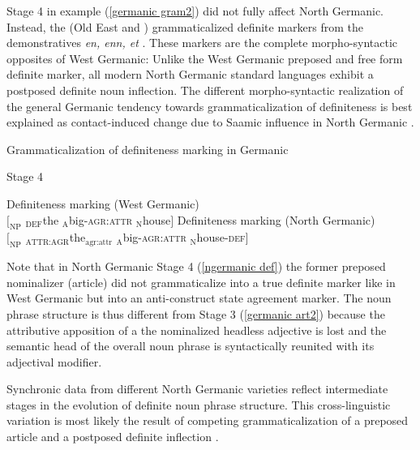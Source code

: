 {Stage 4 in example (\ref{germanic gram2})
did not fully affect North Germanic. Instead, the  (Old East and ) grammaticalized definite markers from the demonstratives \textit{en, enn, et} \citep[15]{heinrichs1954}. These markers are the complete morpho-syntactic opposites of West Germanic: Unlike the West Germanic preposed and free form definite marker, all modern North Germanic standard languages exhibit a postposed definite noun inflection. The different morpho-syntactic realization of the general Germanic tendency towards grammaticalization of definiteness is best explained as contact-induced change due to Saamic influence in North Germanic \citep{kusmenko2008}.
\begin{exe}
\label{germanic gram3}
\ex \rm{Grammaticalization of definiteness marking in Germanic}
\begin{xlist}
\ex \rm{Stage 4}
\begin{xlist}
\ex \rm{Definiteness marking (West Germanic)}\\
$[_{\text{NP}}$ $_{\text{DEF}}$the $_{\text{A}}$big-\textsc{agr:attr} $_{\text{N}}$house$]$
\ex \rm{Definiteness marking (North Germanic)}\\
$[_{\text{NP}}$ $_{\text{ATTR:AGR}}$the$_{\text{agr:attr}}$ $_{\text{A}}$big-\textsc{agr:attr} $_{\text{N}}$house-\textsc{def}$]$\label{ngermanic def}
\end{xlist}
\end{xlist}
\end{exe}
Note that in North Germanic Stage 4 (\ref{ngermanic def}) the former preposed nominalizer (article) did not grammaticalize into a true definite marker like in West Germanic but into an anti\hyp{}construct state agreement marker. The noun phrase structure is thus different from Stage 3 (\ref{germanic art2}) because the attributive apposition of a the nominalized headless adjective is lost and the semantic head of the overall noun phrase is syntactically reunited with its adjectival modifier.

Synchronic data from different North Germanic varieties reflect intermediate stages in the evolution of definite noun phrase structure. This cross-linguistic variation is most likely the result of competing grammaticalization of a preposed article and a postposed definite inflection \citep{dahl2003}. 

}
